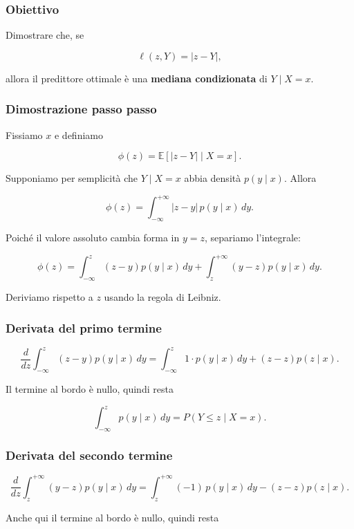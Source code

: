 \documentclass[
]{article}
\begin{document}
\subsubsection{Obiettivo}\label{obiettivo-1}

Dimostrare che, se

\[
\ell(z,Y)=|z-Y|,
\]

allora il predittore ottimale è una \textbf{mediana condizionata} di
\(Y\mid X=x\).

\subsubsection{Dimostrazione passo
passo}\label{dimostrazione-passo-passo-1}

Fissiamo \(x\) e definiamo

\[
\phi(z)=\mathbb{E}[|z-Y|\mid X=x].
\]

Supponiamo per semplicità che \(Y\mid X=x\) abbia densità
\(p(y\mid x)\). Allora

\[
\phi(z)=\int_{-\infty}^{+\infty}|z-y|\,p(y\mid x)\,dy.
\]

Poiché il valore assoluto cambia forma in \(y=z\), separiamo
l'integrale:

\[
\phi(z)=\int_{-\infty}^{z}(z-y)p(y\mid x)\,dy
+\int_{z}^{+\infty}(y-z)p(y\mid x)\,dy.
\]

Deriviamo rispetto a \(z\) usando la regola di Leibniz.

\subsubsection{Derivata del primo
termine}\label{derivata-del-primo-termine}

\[
\frac{d}{dz}\int_{-\infty}^{z}(z-y)p(y\mid x)\,dy
=
\int_{-\infty}^{z}1\cdot p(y\mid x)\,dy + (z-z)p(z\mid x).
\]

Il termine al bordo è nullo, quindi resta

\[
\int_{-\infty}^{z}p(y\mid x)\,dy = P(Y\le z\mid X=x).
\]

\subsubsection{Derivata del secondo
termine}\label{derivata-del-secondo-termine}

\[
\frac{d}{dz}\int_{z}^{+\infty}(y-z)p(y\mid x)\,dy
=
\int_{z}^{+\infty}(-1)\,p(y\mid x)\,dy -(z-z)p(z\mid x).
\]

Anche qui il termine al bordo è nullo, quindi resta
\end{document}
